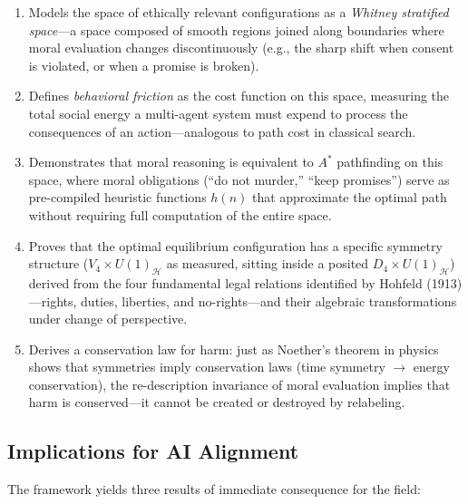 \documentclass[12pt,letterpaper]{article}
\theoremstyle{definition}
\theoremstyle{remark}
\newcommand{\harm}{\mathcal{H}}
\begin{document}
\begin{enumerate}[label=(\roman*)]
    \item Models the space of ethically relevant configurations as a \emph{Whitney stratified space}---a space composed of smooth regions joined along boundaries where moral evaluation changes discontinuously (e.g., the sharp shift when consent is violated, or when a promise is broken).
    \item Defines \emph{behavioral friction} as the cost function on this space, measuring the total social energy a multi-agent system must expend to process the consequences of an action---analogous to path cost in classical search.
    \item Demonstrates that moral reasoning is equivalent to $A^*$ pathfinding on this space, where moral obligations (``do not murder,'' ``keep promises'') serve as pre-compiled heuristic functions $h(n)$ that approximate the optimal path without requiring full computation of the entire space.
    \item Proves that the optimal equilibrium configuration has a specific symmetry structure ($V_4 \times U(1)_\harm$ as measured, sitting inside a posited $D_4 \times U(1)_\harm$) derived from the four fundamental legal relations identified by Hohfeld (1913)---rights, duties, liberties, and no-rights---and their algebraic transformations under change of perspective.
    \item Derives a conservation law for harm: just as Noether's theorem in physics shows that symmetries imply conservation laws (time symmetry $\to$ energy conservation), the re-description invariance of moral evaluation implies that harm is conserved---it cannot be created or destroyed by relabeling.
\end{enumerate}

\subsection{Implications for AI Alignment}

The framework yields three results of immediate consequence for the field:
\end{document}
